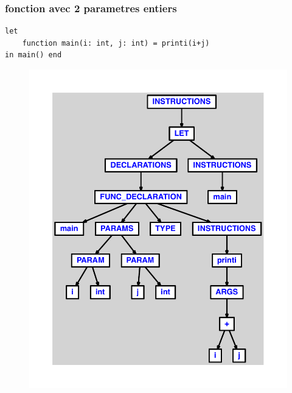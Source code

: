 \documentclass{article}
\begin{document}
\subsubsection{fonction avec 2 parametres entiers}
\begin{lstlisting}
let
	function main(i: int, j: int) = printi(i+j)
in main() end
\end{lstlisting}
\newpage
\begin{figure}[H]
\centering
\includegraphics[max width=\textwidth]{ast/ast_234.pdf}
\end{figure}
\newpage
\end{document}
